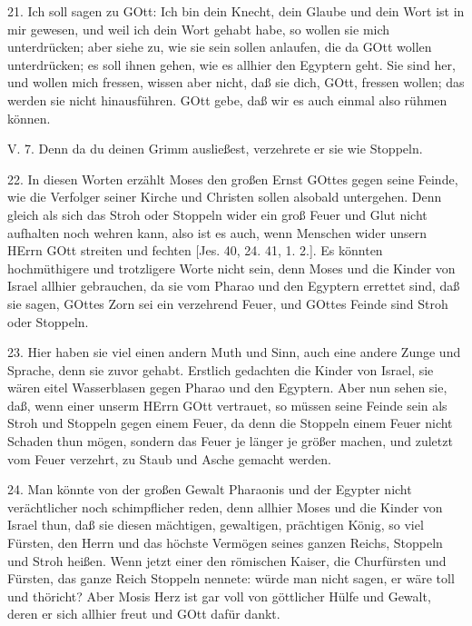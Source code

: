 21. Ich soll sagen zu GOtt: Ich bin dein Knecht, dein Glaube und dein Wort ist in mir gewesen, und weil ich dein Wort gehabt habe, so wollen sie mich unterdrücken; aber siehe zu, wie sie sein sollen anlaufen, die da GOtt wollen unterdrücken; es soll ihnen gehen, wie es allhier den Egyptern geht. Sie sind her, und wollen mich fressen, wissen aber nicht, daß sie dich, GOtt, fressen wollen; das werden sie nicht hinausführen. GOtt gebe, daß wir es auch einmal also rühmen können.

\begin{schriftzitat}
V. 7. Denn da du deinen Grimm ausließest, verzehrete er sie wie Stoppeln.
\end{schriftzitat}

22. In diesen Worten erzählt Moses den großen Ernst GOttes gegen seine Feinde, wie die Verfolger seiner Kirche und Christen sollen alsobald untergehen. Denn gleich als sich das Stroh oder Stoppeln wider ein groß Feuer und Glut nicht aufhalten noch wehren kann, also ist es auch, wenn Menschen wider unsern HErrn GOtt streiten und fechten [Jes. 40, 24. 41, 1. 2.]. Es könnten hochmüthigere und trotzligere Worte nicht sein, denn Moses und die Kinder von Israel allhier gebrauchen, da sie vom Pharao und den Egyptern errettet sind, daß sie sagen, GOttes Zorn sei ein verzehrend Feuer, und GOttes Feinde sind Stroh oder Stoppeln.

23. Hier haben sie viel einen andern Muth und Sinn, auch eine andere Zunge und Sprache, denn sie zuvor gehabt. Erstlich gedachten die Kinder von Israel, sie wären eitel Wasserblasen gegen Pharao und den Egyptern. Aber nun sehen sie, daß, wenn einer unserm HErrn GOtt vertrauet, so müssen seine Feinde sein als Stroh und Stoppeln gegen einem Feuer, da denn die Stoppeln einem Feuer nicht Schaden thun mögen, sondern das Feuer je länger je größer machen, und zuletzt vom Feuer verzehrt, zu Staub und Asche gemacht werden.

24. Man könnte von der großen Gewalt Pharaonis und der Egypter nicht verächtlicher noch schimpflicher reden, denn allhier Moses und die Kinder von Israel thun, daß sie diesen mächtigen, gewaltigen, prächtigen König, so viel Fürsten, den Herrn und das höchste Vermögen seines ganzen Reichs, Stoppeln und Stroh heißen. Wenn jetzt einer den römischen Kaiser, die Churfürsten und Fürsten, das ganze Reich Stoppeln nennete: würde man nicht sagen, er wäre toll und thöricht? Aber Mosis Herz ist gar voll von göttlicher Hülfe und Gewalt, deren er sich allhier freut und GOtt dafür dankt.

